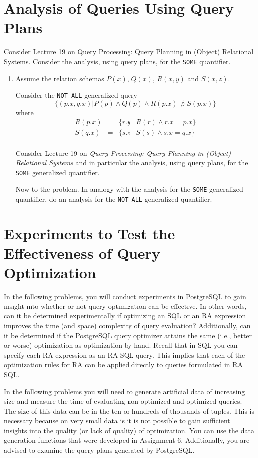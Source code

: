 \documentclass{article}
\begin{document}
\vfill
\newpage
\section{Analysis of Queries Using Query Plans}

Consider Lecture 19 on Query Processing: Query Planning in (Object) Relational Systems.
Consider the analysis, using query plans, for the {\tt SOME} quantifier.

\begin{enumerate}
\item Assume the relation schemas $P(x)$, $Q(x)$, $R(x,y)$ and $S(x,z)$.

Consider the {\tt NOT ALL} generalized query
\[\{(p.x,q.x) | P(p)\land Q(p) \land R(p.x) \not\supset S(p.x)\}\]
where
\[
\begin{array}{rcl}
R(p.x) & = & \{r.y\mid R(r) \land r.x = p.x\} \\
S(q.x) & = & \{s.z\mid S(s) \land s.x = q.x\} \\
\end{array}
\]

Consider Lecture 19 on \emph{Query Processing: Query Planning in (Object) Relational Systems} and
in particular the analysis, using query plans, for the {\tt SOME} generalized quantifier.

Now to the problem.
In analogy with the analysis for the {\tt SOME} generalized quantifier, do an analysis for the {\tt NOT ALL} generalized quantifier.
\end{enumerate}

\section{Experiments to Test the Effectiveness of Query Optimization}
In the following problems, you will conduct experiments in PostgreSQL to gain insight into
whether or not query optimization can be effective.  
In other words, can it be determined experimentally 
if optimizing an SQL or an RA expression improves the time (and space) complexity of query evaluation?
Additionally, can it be determined if the PostgreSQL query optimizer attains the same (i.e., better or worse)
optimization as optimization by hand.
Recall that in SQL you can specify each RA expression as an RA SQL query.   This implies that each of the
optimization rules for RA can be applied directly to queries formulated in RA SQL.

In the following problems you will need to generate artificial data
of increasing size and measure the time of evaluating non-optimized and
optimized queries.    The size of this data can be in the ten or hundreds of thousands of tuples.
This is necessary because on very small data is it is not possible to gain
sufficient insights into the quality (or lack of quality) of optimization.
You can use the data generation functions that were developed in Assignment 6.
Additionally, you are advised to examine the query plans generated by PostgreSQL.
\end{document}
